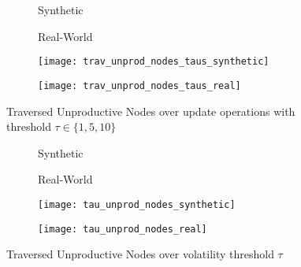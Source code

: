 \documentclass[abstracton,12pt]{scrartcl}
\theoremstyle{definition}
\begin{document}

\begin{figure}[h]
  \centering
  \begin{subfigure}{0.49\linewidth}
    \centering
    Synthetic
  \end{subfigure}
  \begin{subfigure}{0.49\linewidth}
    \centering
    Real-World
  \end{subfigure}
  \begin{subfigure}{0.49\linewidth}
    \centering
    \texttt{[image: trav\_unprod\_nodes\_taus\_synthetic]}
    \caption{}
    \label{fig:trav_unprod_nodes_taus_synthetic}
  \end{subfigure}
  \begin{subfigure}{0.49\linewidth}
    \centering
    \texttt{[image: trav\_unprod\_nodes\_taus\_real]}
    \caption{}
    \label{fig:trav_unprod_nodes_taus_real}
  \end{subfigure}
  \caption{Traversed Unproductive Nodes over update operations with threshold $\tau \in \{1,5,10\}$}
\end{figure}

\begin{figure}[h]
  \centering
  \begin{subfigure}{0.49\linewidth}
    \centering
    Synthetic
  \end{subfigure}
  \begin{subfigure}{0.49\linewidth}
    \centering
    Real-World
  \end{subfigure}
  \begin{subfigure}{0.49\linewidth}
    \centering
    \texttt{[image: tau\_unprod\_nodes\_synthetic]}
    \caption{}
    \label{fig:tau_unprod_nodes_synthetic}
  \end{subfigure}
  \begin{subfigure}{0.49\linewidth}
    \centering
    \texttt{[image: tau\_unprod\_nodes\_real]}
    \caption{}
    \label{fig:tau_unprod_nodes_real}
  \end{subfigure}
  \caption{Traversed Unproductive Nodes over volatility threshold $\tau$}
\end{figure}
\end{document}
